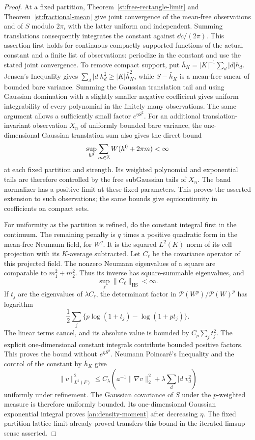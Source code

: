 \begin{proof}
At a fixed partition, Theorem~\ref{st:free-rectangle-limit} and
Theorem~\ref{st:fractional-mean} give joint convergence of the
mean-free observations and of $S$ modulo $2\pi$, with the latter
uniform and independent.  Summing translations consequently
integrates the constant against $\dd c/(2\pi)$.  This assertion first
holds for continuous compactly supported functions of the actual
constant and a finite list of observations: periodize in the constant
and use the stated joint convergence.  To remove compact support,
put $\bar h_K=|K|^{-1}\sum_d|d|h_d$.  Jensen's Inequality gives
$\sum_d|d|h_d^2\ge |K|\bar h_K^2$, while
$S-\bar h_K$ is a mean-free smear of bounded bare variance.  Summing
the Gaussian translation tail and using Gaussian domination with a
slightly smaller negative coefficient gives uniform integrability
of every polynomial in the finitely many observations.  The same
argument allows a sufficiently small factor $e^{\eta S^2}$.
For an additional translation-invariant observation $X_n$ of uniformly
bounded bare variance, the one-dimensional Gaussian translation sum
also gives the direct bound
\[
 \sup_{h^0}\sum_{m\in\mathbb Z}W(h^0+2\pi m)<\infty
\]
at each fixed partition and strength.  Its weighted polynomial and
exponential tails are therefore controlled by the free subGaussian
tails of $X_n$.  The band normalizer has a positive limit at these fixed
parameters.  This proves the asserted extension to such observations;
the same bounds give equicontinuity in coefficients on compact sets.

For uniformity as the partition is refined, do the constant integral
first in the continuum.  The remaining penalty is $q$ times a
positive quadratic form in the mean-free Neumann field, for $W^q$.
It is the squared $L^2(K)$ norm of its cell projection with its
$K$-average subtracted.  Let $C_\ell$ be the covariance operator of
this projected field.  The nonzero Neumann eigenvalues of a square
are comparable to $m_1^2+m_2^2$.  Thus its inverse has square-summable
eigenvalues, and
\begin{equation}
 \sup_\ell\|C_\ell\|_{\mathrm{HS}}<\infty.
 \label{an:band-hs}
\end{equation}
If $t_j$ are the eigenvalues of $\lambda C_\ell$, the determinant
factor in $\mathcal P(W^p)/\mathcal P(W)^p$ has logarithm
\[
 \frac12\sum_j\{p\log(1+t_j)-\log(1+pt_j)\}.
\]
The linear terms cancel, and its absolute value is bounded by
$C_p\sum_jt_j^2$.  The explicit one-dimensional constant integrals
contribute bounded positive factors.  This proves the bound without
$e^{\eta S^2}$.  Neumann Poincar\'e's Inequality and the control of the
constant by $\bar h_K$ give
\[
 \|v\|_{L^2(F)}^2\le C_\lambda
 \left(a^{-1}\|\nabla v\|_2^2+
       \lambda\sum_d|d|v_d^2\right)
\]
uniformly under refinement.  The Gaussian covariance of $S$ under
the $p$-weighted measure is therefore uniformly bounded.  Its
one-dimensional Gaussian exponential integral proves
\eqref{an:density-moment} after decreasing $\eta$.  The fixed
partition lattice limit already proved transfers this bound in the
iterated-limsup sense asserted.


\end{proof}

